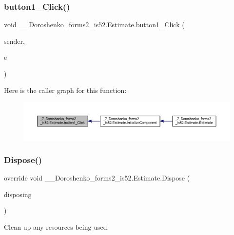 \subsubsection{\texorpdfstring{button1\+\_\+\+Click()}{button1\_Click()}}
{\footnotesize\ttfamily void \+\_\+\_\+\+Doroshenko\+\_\+forms2\+\_\+is52.\+Estimate.\+button1\+\_\+\+Click (\begin{DoxyParamCaption}\item[{object}]{sender,  }\item[{Event\+Args}]{e }\end{DoxyParamCaption})\hspace{0.3cm}{\ttfamily [private]}}

Here is the caller graph for this function\+:
\nopagebreak
\begin{figure}[H]
\begin{center}
\leavevmode
\includegraphics[width=350pt]{class__7___doroshenko__forms2__is52_1_1_estimate_a34445933242ab461b53690eaa9f294df_icgraph}
\end{center}
\end{figure}
\hypertarget{class__7___doroshenko__forms2__is52_1_1_estimate_abffe80b5045e2981127d003b617f9e7a}{}\label{class__7___doroshenko__forms2__is52_1_1_estimate_abffe80b5045e2981127d003b617f9e7a} 
\subsubsection{\texorpdfstring{Dispose()}{Dispose()}}
{\footnotesize\ttfamily override void \+\_\+\_\+\+Doroshenko\+\_\+forms2\+\_\+is52.\+Estimate.\+Dispose (\begin{DoxyParamCaption}\item[{bool}]{disposing }\end{DoxyParamCaption})\hspace{0.3cm}{\ttfamily [protected]}}



Clean up any resources being used. 


